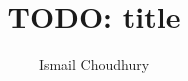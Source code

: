 \documentclass[12pt]{third-rep}
\title{TODO: title}
\author{Ismail Choudhury}
\begin{document}
\dotitleandabstract

\tableofcontents
\listoffigures
\listoftables










           

\appendix

\end{document}
